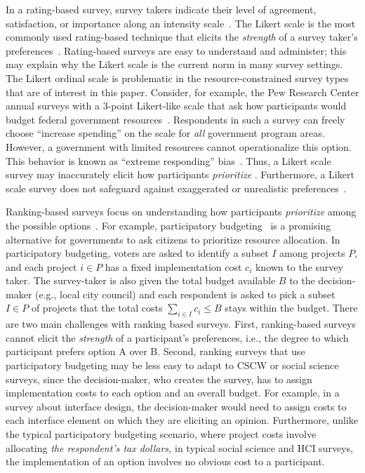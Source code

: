 In a rating-based survey, survey takers indicate their level of agreement, satisfaction, or importance along an intensity scale~\cite{moors2016two}. The Likert scale is the most commonly used rating-based technique that elicits the \textit{strength} of a survey taker's preferences~\cite{likert1932technique}. Rating-based surveys are easy to understand and administer; this may explain why the Likert scale is the current norm in many survey settings. The Likert ordinal scale is problematic in the resource-constrained survey types that are of interest in this paper. Consider, for example, the Pew Research Center annual surveys with a 3-point Likert-like scale that ask how participants would budget federal government resources~\cite{pew_spending}. Respondents in such a survey can freely choose  ``increase spending'' on the scale for \textit{all} government program areas. However, a government with limited resources cannot operationalize this option. This behavior is known as ``extreme responding'' bias~\cite{batchelor2016extreme, furnham1986response, meisenberg2008acquiescent}. Thus, a Likert scale survey may inaccurately elicit how participants \textit{prioritize} . Furthermore, a Likert scale survey does not safeguard against exaggerated or unrealistic preferences~\cite{araujo2017much, vavreck2007exaggerated}.

Ranking-based surveys focus on understanding how participants \textit{prioritize} among the possible options~\cite{moors2016two}. For example, participatory budgeting~\cite{cabannes2004participatory,goel2015knapsack,Goel2016, Lee2014, benade2020preference} is a promising alternative for governments to ask citizens to prioritize resource allocation.  In participatory budgeting, voters are asked to identify a subset $I$ among projects $P$, and each project $i \in P$ has a fixed implementation cost $c_i$ known to the survey taker. The survey-taker is also given the total budget available $B$ to the decision-maker (e.g., local city council) and each respondent is asked to pick a subset $I \in P$ of projects that the total costs $\sum_{i \in I} c_i \leqslant B$ stays within the budget. There are two main challenges with ranking based surveys. First, ranking-based surveys cannot elicit the \textit{strength} of a participant's preferences, i.e., the degree to which participant prefers option A over B. Second, ranking surveys that use participatory budgeting may be less easy to adapt to CSCW or social science surveys, since the decision-maker, who creates the survey, has to assign implementation costs to each option and an overall budget. For example, in a survey about interface design, the decision-maker would need to assign costs to each interface element on which they are eliciting an opinion. Furthermore, unlike the typical participatory budgeting scenario, where project costs involve allocating \textit{the respondent's tax dollars,} in typical social science and HCI surveys, the implementation of an option involves no obvious cost to a participant. 

